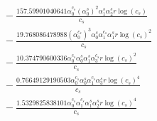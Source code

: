 \documentclass[10pt]{article}
\begin{document}
\begin{align*}
&{}  - \frac{157.59901040641 \alpha_{0}^{c_s} \left(\alpha_{0}^s\right)^{2} \alpha_{1}^s \alpha_{2}^s r \log{\left(c_{s} \right)}}{c_{s}} \\
&{}  - \frac{19.768086478988 \left(\alpha_{0}^{c_s}\right)^{3} \alpha_{0}^s \alpha_{1}^{c_s} \alpha_{1}^s r \log{\left(c_{s} \right)}^{2}}{c_{s}} \\
&{}  - \frac{10.374790600336 \alpha_{0}^{c_s} \alpha_{0}^s \alpha_{1}^s \alpha_{3}^{c_s} r \log{\left(c_{s} \right)}^{2}}{c_{s}} \\
&{}  - \frac{0.76649129190503 \alpha_{0}^{c_s} \alpha_{0}^s \alpha_{1}^{c_s} \alpha_{3}^s r \log{\left(c_{s} \right)}^{4}}{c_{s}} \\
&{}  - \frac{1.5329825838101 \alpha_{0}^{c_s} \alpha_{1}^{c_s} \alpha_{1}^s \alpha_{2}^s r \log{\left(c_{s} \right)}^{4}}{c_{s}}
\end{align*}
\end{document}
